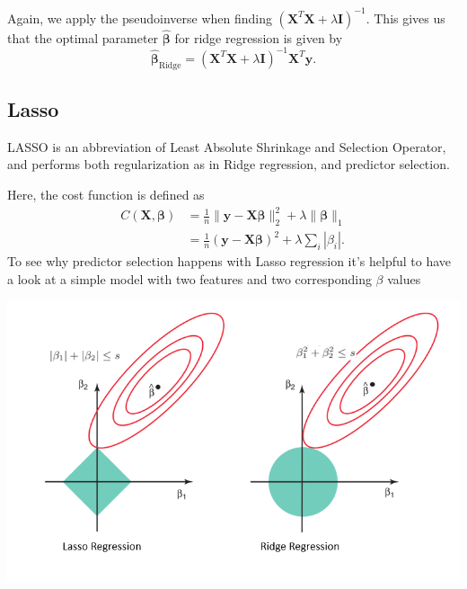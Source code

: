 \documentclass{article}
\begin{document}
Again, we apply the pseudoinverse when finding $(\textbf{X}^T \textbf{X} + \lambda \boldsymbol{I})^{-1}$. This gives us that the optimal parameter $\boldsymbol{\hat{\beta}}$ for ridge regression is given by
\begin{equation*}
    \boldsymbol{\hat{\beta}}_\text{Ridge} = (\textbf{X}^T \textbf{X} + \lambda \boldsymbol{I})^{-1} \textbf{X}^T \boldsymbol{y}.
\end{equation*} 




\subsection{Lasso}
LASSO is an abbreviation of Least Absolute Shrinkage and Selection Operator, and performs both regularization as in Ridge regression, and predictor selection.

Here, the cost function is defined as
\begin{align*}
    C \left( \textbf{X}, \boldsymbol{\beta} \right) &= \frac{1}{n} \lVert \boldsymbol{y} - \textbf{X} \boldsymbol{\beta} \rVert_2^2 + \lambda \lVert \boldsymbol{\beta} \rVert_1 \\
    &= \frac{1}{n} \left( \boldsymbol{y} - \textbf{X} \boldsymbol{\beta} \right)^2 + \lambda \sum_i |\beta_i|.
\end{align*}
To see why predictor selection happens with Lasso regression it's helpful to have a look at a simple model with two features and two corresponding $\beta$ values

\begin{center}
    \includegraphics[width=\textwidth]{lasso_ridge_contour.png}
\end{center}
\end{document}
